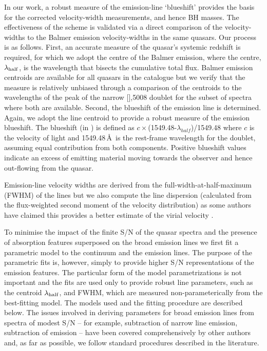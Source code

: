 In our work, a robust measure of the  emission-line `blueshift' provides the basis for the corrected  velocity-width measurements, and hence BH masses.
The effectiveness of the scheme is validated via a direct comparison of the  velocity-widths to the Balmer emission velocity-widths in the same quasars. 
Our process is as follows. 
First, an accurate measure of the quasar's systemic redshift is required, for which we adopt the centre of the Balmer emission, where the centre, $\lambda_{\rm half}$, is the wavelength that bisects the cumulative total flux. 
Balmer emission centroids are available for all quasars in the catalogue but we verify that the measure is relatively unbiased through a comparison of the centroids to the wavelengths of the peak of the narrow [],5008 doublet for the subset of spectra where both are available. 
Second, the blueshift of the  emission line is determined. 
Again, we adopt the line centroid to provide a robust measure of the  emission blueshift.
The blueshift (in \kms) is defined as $c\times$(1549.48-$\lambda_{half}$)/1549.48 where $c$ is the velocity of light and 1549.48\,\AA \ is the rest-frame wavelength for the  doublet, assuming equal contribution from both components.
Positive blueshift values indicate an excess of emitting material moving towards the observer and hence out-flowing from the quasar. 

Emission-line velocity widths are derived from the full-width-at-half-maximum (FWHM) of the lines but we also compute the line dispersion (calculated from the flux-weighted second moment of the velocity distribution) as some authors have claimed this provides a better estimate of the virial velocity \citep{denney13}. 

To minimise the impact of the finite S/N of the quasar spectra and the presence of absorption features superposed on the broad emission lines we first fit a parametric model to the continuum and the emission lines. 
The purpose of the parametric fits is, however, simply to provide higher S/N representations of the emission features. 
The particular form of the model parametrizations is not important and the fits are used only to provide robust line parameters, such as the centroid $\lambda_{\rm half}$, and FWHM, which are measured non-parameterically from the best-fitting model. 
The models used and the fitting procedure are described below. 
The issues involved in deriving parameters for broad emission lines from spectra of modest S/N -- for example, subtraction of narrow line emission, subtraction of  emission -- have been covered comprehensively by other authors \citep[e.g.][]{shen11,shen12,denney13,shen16a} and, as far as possible, we follow standard procedures described in the literature. 

